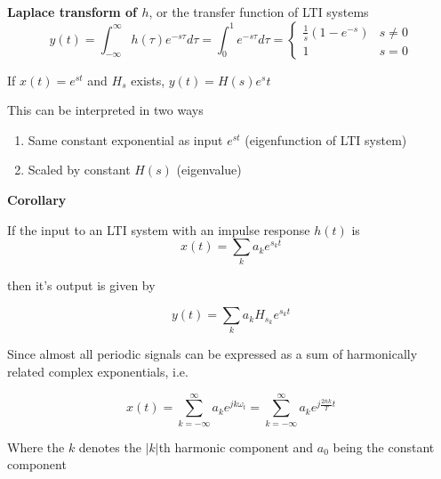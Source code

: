 \documentclass[../notes.tex]{subfiles}
\begin{document}
\begin{definition}
	\textbf{Laplace transform of $ h $}, or the transfer function of LTI systems
\begin{equation}
	y(t) = \int_{-\infty}^{\infty}  h(\tau) e^{-s\tau} d \tau = \int_{0}^{1}  e^{-s\tau}d\tau = \begin{cases}
		\frac{1}{s} (1-e^{-s}) & s \neq  0\\
		1 & s = 0
	\end{cases} 
\end{equation}



	
\end{definition}

\begin{theorem}
	If $ x(t) = e^{st} $ and $ H_s $ exists, $ y(t) = H(s) e^st $

	This can be interpreted in two ways

	\begin{enumerate}
		\item Same constant exponential as input	$e^{st} $ (eigenfunction of LTI system)
		\item Scaled by constant $ H(s) $ (eigenvalue)
	\end{enumerate}

	\textbf{Corollary} 

	If the input to an LTI system with an impulse response $ h(t) $ is 
	\begin{equation}
		x(t) = \sum_k a_k e ^{s_kt}
	\end{equation}
	
		then it's output is given by

		\begin{equation}
			y(t) = \sum_k a_k H_{s_k} e^{s_kt}
		\end{equation}
		

\end{theorem}

Since almost all periodic signals can be expressed as a sum of harmonically related complex exponentials, i.e.


\begin{equation}
	x(t) = 
	\sum_{k=-\infty}^{\infty} a_k e^{j k\omega_ t } = 
	\sum_{k=-\infty}^{\infty} a_k e^{j \frac{2\overline{n}k}{T}t}
\end{equation}

Where the $ k $ denotes the $ |k| $th harmonic component and $ a_0 $ being the constant component
\end{document}
